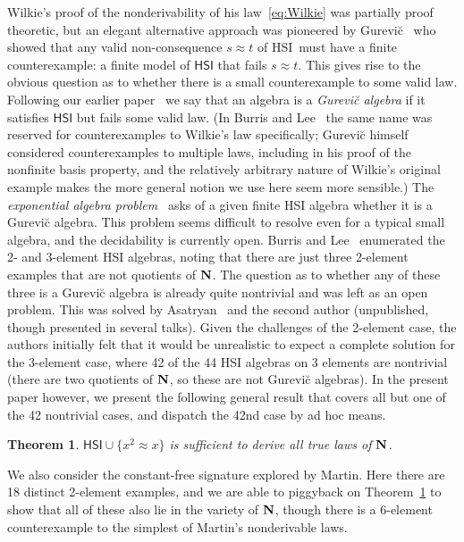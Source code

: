 \documentclass[eqnor,reqno]{amsart}
\theoremstyle{plain}
\newtheorem{thm}{Theorem}[section]
\theoremstyle{definition}
\newcommand{\HSI}{\textsf{HSI}}
\begin{document}
Wilkie's proof of the nonderivability of his law~\eqref{eq:Wilkie} was partially proof theoretic, but an elegant alternative approach was pioneered by Gurevi\u{c}~\cite{gur85} who showed that any valid non-consequence $s\approx t$ of \HSI\ must have a finite counterexample: a finite model of $\HSI$ that fails $s\approx t$.  
This gives rise to the obvious question as to whether there is a small counterexample to some valid law.
Following our earlier paper~\cite{alsjac2} we say that an algebra is a \emph{Gurevi\u{c} algebra} if it satisfies $\HSI$ but fails some valid law.  (In Burris and Lee~\cite{burlee92} the same name was reserved for counterexamples to Wilkie's law specifically; Gurevi\u{c} himself considered counterexamples to multiple laws, including in his proof of the nonfinite basis property, and the relatively arbitrary nature of Wilkie's original example makes the more general notion we use here seem more sensible.)
The \emph{exponential algebra problem}~\cite{alsjac2} asks of a given finite HSI algebra whether it is a Gurevi\u{c} algebra.  
This problem seems difficult to resolve even for a typical small algebra, and the decidability is currently open.
Burris and Lee~\cite{burlee92} enumerated the 2- and 3-element HSI algebras, noting that there are just three 2-element examples that are not quotients of ${\bf N}$.  
The question as to whether any of these three is a Gurevi\u{c} algebra is already quite nontrivial and was left as an open problem.  This was solved by Asatryan~\cite{asa} and the second author (unpublished, though presented in several talks).
Given the challenges of the 2-element case, the authors initially felt that it would be unrealistic to expect a complete solution for the $3$-element case, where 42 of the 44 HSI algebras on 3 elements are nontrivial (there are two quotients of ${\bf N}$, so these are not Gurevi\u{c} algebras).  
In the present paper however, we present the following general result that covers all but one of the 42 nontrivial cases, and dispatch the 42nd case by ad hoc means.
\begin{thm}\label{thm:main}
$\HSI\cup\{x^2\approx x\}$ is sufficient to derive all true laws of ${\bf N}$.
\end{thm}
We also consider the constant-free signature explored by Martin.  Here there are 18 distinct 2-element examples, and we are able to piggyback on  Theorem~\ref{thm:main} to show that all of these also lie in the variety of ${\bf N}$, though there is a 6-element counterexample to the simplest of Martin's nonderivable laws.
\end{document}
